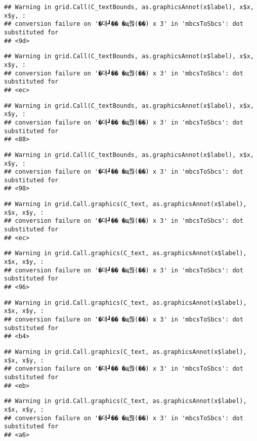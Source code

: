 \documentclass[
]{article}
\begin{document}
\begin{verbatim}
## Warning in grid.Call(C_textBounds, as.graphicsAnnot(x$label), x$x, x$y, :
## conversion failure on '�대┛�� �щ쭩(��) x 3' in 'mbcsToSbcs': dot substituted for
## <9d>
\end{verbatim}

\begin{verbatim}
## Warning in grid.Call(C_textBounds, as.graphicsAnnot(x$label), x$x, x$y, :
## conversion failure on '�대┛�� �щ쭩(��) x 3' in 'mbcsToSbcs': dot substituted for
## <ec>
\end{verbatim}

\begin{verbatim}
## Warning in grid.Call(C_textBounds, as.graphicsAnnot(x$label), x$x, x$y, :
## conversion failure on '�대┛�� �щ쭩(��) x 3' in 'mbcsToSbcs': dot substituted for
## <88>
\end{verbatim}

\begin{verbatim}
## Warning in grid.Call(C_textBounds, as.graphicsAnnot(x$label), x$x, x$y, :
## conversion failure on '�대┛�� �щ쭩(��) x 3' in 'mbcsToSbcs': dot substituted for
## <98>
\end{verbatim}

\begin{verbatim}
## Warning in grid.Call.graphics(C_text, as.graphicsAnnot(x$label), x$x, x$y, :
## conversion failure on '�대┛�� �щ쭩(��) x 3' in 'mbcsToSbcs': dot substituted for
## <ec>
\end{verbatim}

\begin{verbatim}
## Warning in grid.Call.graphics(C_text, as.graphicsAnnot(x$label), x$x, x$y, :
## conversion failure on '�대┛�� �щ쭩(��) x 3' in 'mbcsToSbcs': dot substituted for
## <96>
\end{verbatim}

\begin{verbatim}
## Warning in grid.Call.graphics(C_text, as.graphicsAnnot(x$label), x$x, x$y, :
## conversion failure on '�대┛�� �щ쭩(��) x 3' in 'mbcsToSbcs': dot substituted for
## <b4>
\end{verbatim}

\begin{verbatim}
## Warning in grid.Call.graphics(C_text, as.graphicsAnnot(x$label), x$x, x$y, :
## conversion failure on '�대┛�� �щ쭩(��) x 3' in 'mbcsToSbcs': dot substituted for
## <eb>
\end{verbatim}

\begin{verbatim}
## Warning in grid.Call.graphics(C_text, as.graphicsAnnot(x$label), x$x, x$y, :
## conversion failure on '�대┛�� �щ쭩(��) x 3' in 'mbcsToSbcs': dot substituted for
## <a6>
\end{verbatim}
\end{document}
